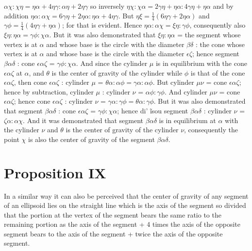 \documentclass[12pt]{article}
\begin{document}
$\alpha\chi : \chi\eta = \eta\alpha + 4\eta\gamma : \alpha\eta +
2\eta\gamma$ so inversely $\eta\chi : \chi\alpha = 2\gamma\eta +
\eta\alpha : 4\gamma\eta + \eta\alpha$ and by addition $\eta\alpha :
\alpha\chi = 6\gamma\eta + 2\eta\alpha : \eta\alpha +
4\eta\gamma$. But $\eta\xi = \frac{1}{4} (6\eta\gamma + 2\eta\alpha)$
and $\gamma\phi = \frac{1}{4} (4\eta\gamma + \eta\alpha)$; for that is
evident.  Hence $\eta\alpha : \alpha\chi = \xi\eta : \gamma\phi$,
consequently also $\xi\eta : \eta\alpha = \gamma\phi : \chi\alpha$.
But it was also demonstrated that $\xi\eta : \eta\alpha$ = the segment
whose vertex is at $\alpha$ and whose base is the circle with the
diameter $\beta\delta$ : the cone whose vertex is at $\alpha$ and
whose base is the circle with the diameter $\epsilon\zeta$; hence
segment $\beta\alpha\delta$ : cone $\epsilon\alpha\zeta$ = $\gamma\phi
: \chi\alpha$. And since the cylinder $\mu$ is in equilibrium with the
cone $\epsilon\alpha\zeta$ at $\alpha$, and $\theta$ is the center of
gravity of the cylinder while $\phi$ is that of the cone
$\epsilon\alpha\zeta$, then cone $\epsilon\alpha\zeta$ : cylinder
$\mu$ = $\theta\alpha : \alpha\phi = \gamma\alpha : \alpha\phi$. But
cylinder $\mu\nu$ = cone $\epsilon\alpha\zeta$; hence by subtraction,
cylinder $\mu$ : cylinder $\nu$ = $\alpha\phi : \gamma\phi$. And
cylinder $\mu\nu$ = cone $\epsilon\alpha\zeta$; hence cone
$\epsilon\alpha\zeta$ : cylinder $\nu$ = $\gamma\alpha : \gamma\phi =
\theta\alpha : \gamma\phi$.  But it was also demonstrated that segment
$\beta\alpha\delta$ : cone $\epsilon\alpha\zeta$ = $\gamma\phi :
\chi\alpha$; hence {di' \~isou} segment
$\beta\alpha\delta$ : cylinder $\nu$ = $\zeta\alpha : \alpha\chi$.
And it was demonstrated that segment $\beta\alpha\delta$ is in
equilibrium at $\alpha$ with the cylinder $\nu$ and $\theta$ is the
center of gravity of the cylinder $\nu$, consequently the point $\chi$
is also the center of gravity of the segment $\beta\alpha\delta$.


\section*{Proposition IX}

In a similar way it can also be perceived that the center of gravity
of any segment of an ellipsoid lies on the straight line which is the
axis of the segment so divided that the portion at the vertex of the
segment bears the same ratio to the remaining portion as the axis of
the segment + 4 times the axis of the opposite segment bears to the
axis of the segment + twice the axis of the opposite segment.
\end{document}
